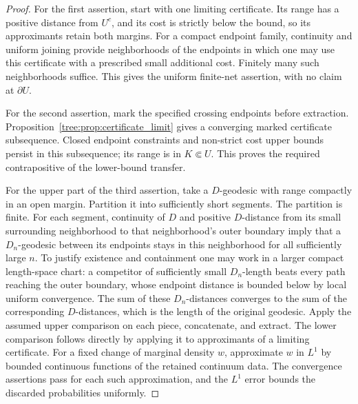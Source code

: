 \begin{proof}
For the first assertion, start with one limiting certificate.  Its
range has a positive distance from $U^c$, and its cost is strictly
below the bound, so its approximants retain both margins.  For a
compact endpoint family, continuity and uniform joining provide
neighborhoods of the endpoints in which one may use this certificate
with a prescribed small additional cost.  Finitely many such
neighborhoods suffice.  This gives the uniform finite-net assertion,
with no claim at $\partial U$.

For the second assertion, mark the specified crossing endpoints
before extraction.  Proposition~\ref{tree:prop:certificate_limit} gives
a converging marked certificate subsequence.  Closed endpoint
constraints and non-strict cost upper bounds persist in this
subsequence; its range is in $K\Subset U$.  This proves the required
contrapositive of the lower-bound transfer.

For the upper part of the third assertion, take a $D$-geodesic with
range compactly in an open margin.  Partition it into sufficiently
short segments.  The partition is finite.  For each segment,
continuity of $D$ and positive $D$-distance from its small surrounding
neighborhood to that neighborhood's outer boundary imply that a
$D_n$-geodesic between its endpoints stays in this neighborhood for
all sufficiently large $n$.  To justify existence and containment
one may work in a larger compact length-space chart: a competitor
of sufficiently small $D_n$-length beats every path reaching the
outer boundary, whose endpoint distance is bounded below by local
uniform convergence.  The sum of these $D_n$-distances converges to
the sum of the corresponding $D$-distances, which is the length of
the original geodesic.  Apply the assumed upper comparison on each
piece, concatenate, and extract.  The lower comparison follows
directly by applying it to approximants of a limiting certificate.
For a fixed change of marginal density $w$, approximate $w$ in
$L^1$ by bounded continuous functions of the retained continuum
data.  The convergence assertions pass for each such approximation,
and the $L^1$ error bounds the discarded probabilities uniformly.
\end{proof}

